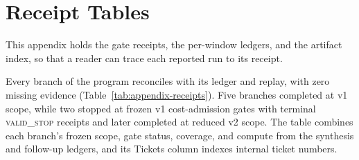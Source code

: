 \section{Receipt Tables}
\label{app:receipts}

This appendix holds the gate receipts, the per-window ledgers, and the artifact index, so that a reader can trace each reported run to its receipt.

Every branch of the program reconciles with its ledger and replay, with zero missing evidence (Table~\ref{tab:appendix-receipts}). Five branches completed at v1 scope, while two stopped at frozen v1 cost-admission gates with terminal \textsc{valid\_stop} receipts and later completed at reduced v2 scope. The table combines each branch's frozen scope, gate status, coverage, and compute from the synthesis and follow-up ledgers, and its Tickets column indexes internal ticket numbers.

